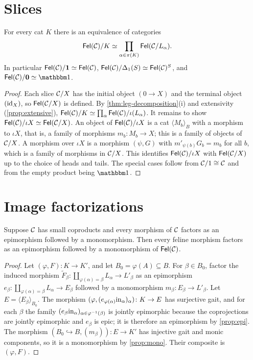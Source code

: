\section{Slices}\label{sec:slices}

\begin{theorem}\label{thm:slice}
For every cat $K$ there is an equivalence of categories
\[
\mathsf{Fel}(\mathcal{C})/K\simeq\prod_{\alpha\in\pi(K)}\mathsf{Fel}(\mathcal{C}/L_\alpha).
\]
In particular $\mathsf{Fel}(\mathcal{C})/\mathbf{1}\simeq\mathsf{Fel}(\mathcal{C})$, $\mathsf{Fel}(\mathcal{C})/\Delta_1(S)\simeq\mathsf{Fel}(\mathcal{C})^S$,
and $\Fel(\cC)/\Legless\eqv\one$.
\end{theorem}

\begin{proof}
Each slice $\mathcal{C}/X$ has the initial object $(0\to X)$ and the terminal object
$(\mathrm{id}_X)$, so $\mathsf{Fel}(\mathcal{C}/X)$ is defined. By \cref{thm:leg-decomposition}(i) and
extensivity (\cref{prop:extensive}),
$\mathsf{Fel}(\mathcal{C})/K\simeq\prod_\alpha\mathsf{Fel}(\mathcal{C})/\iota(L_\alpha)$. It remains to show
$\mathsf{Fel}(\mathcal{C})/\iota X\simeq\mathsf{Fel}(\mathcal{C}/X)$. An object of $\mathsf{Fel}(\mathcal{C})/\iota X$ is a cat
$\langle M_b\rangle_B$ with a morphism to $\iota X$, that is, a family of
morphisms $m_b\colon M_b\to X$; this is a family of objects of $\mathcal{C}/X$. A
morphism over $\iota X$ is a morphism $(\psi,G)$ with $m'_{\psi(b)}G_b=m_b$ for
all $b$, which is a family of morphisms in $\mathcal{C}/X$. This identifies
$\mathsf{Fel}(\mathcal{C})/\iota X$ with $\mathsf{Fel}(\mathcal{C}/X)$ up to the choice of heads and tails. The
special cases follow from $\mathcal{C}/1\cong\mathcal{C}$ and from the empty product being
$\one$.
\end{proof}

\section{Image factorizations}\label{sec:image}

\begin{proposition}\label{prop:image}
Suppose $\mathcal{C}$ has small coproducts and every morphism of $\mathcal{C}$ factors as an
epimorphism followed by a monomorphism. Then every feline morphism factors as
an epimorphism followed by a monomorphism of $\mathsf{Fel}(\mathcal{C})$.
\end{proposition}

\begin{proof}
Let $(\varphi,F)\colon K\to K'$, and let $B_0=\varphi(A)\subseteq B$. For
$\beta\in B_0$, factor the induced morphism
$\tilde F_\beta\colon\coprod_{\varphi(\alpha)=\beta}L_\alpha\to L'_\beta$ as an
epimorphism $e_\beta\colon\coprod_{\varphi(\alpha)=\beta}L_\alpha\to E_\beta$ followed by
a monomorphism $m_\beta\colon E_\beta\to L'_\beta$. Let $E=\langle E_\beta\rangle_{B_0}$.
The morphism $(\varphi,(e_{\varphi(\alpha)}\mathrm{in}_\alpha)_\alpha)\colon K\to E$ has
surjective gait, and for each $\beta$ the family
$(e_\beta\mathrm{in}_\alpha)_{\alpha\in\varphi^{-1}(\beta)}$ is jointly epimorphic because
the coprojections are jointly epimorphic and $e_\beta$ is epic; it is therefore
an epimorphism by \cref{prop:epi}. The morphism $(B_0\hookrightarrow B,(m_\beta))\colon E\to K'$
has injective gait and monic components, so it is a monomorphism by
\cref{prop:mono}. Their composite is $(\varphi,F)$.
\end{proof}

